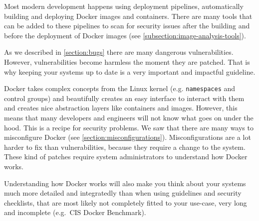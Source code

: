 \hfill

Most modern development happens using deployment pipelines, automatically building and deploying Docker images and containers. There are many tools that can be added to these pipelines to scan for security issues after the building and before the deployment of Docker images (see \autoref{subsection:image-analysis-tools}).

\hfill

As we described in \autoref{section:bugs} there are many dangerous vulnerabilities. However, vulnerabilities become harmless the moment they are patched. That is why keeping your systems up to date is a very important and impactful guideline.

\hfill

Docker takes complex concepts from the Linux kernel (e.g. \lstinline{namespaces} and control groups) and beautifully creates an easy interface to interact with them and creates nice abstraction layers like containers and images. However, this means that many developers and engineers will not know what goes on under the hood. This is a recipe for security problems. We saw that there are many ways to misconfigure Docker (see \autoref{section:misconfigurations}). Misconfigurations are a lot harder to fix than vulnerabilities, because they require a change to the system. These kind of patches require system administrators to understand how Docker works.


Understanding how Docker works will also make you think about your systems much more detailed and integratedly than when using guidelines and security checklists, that are most likely not completely fitted to your use-case, very long and incomplete (e.g.\ CIS Docker Benchmark).
